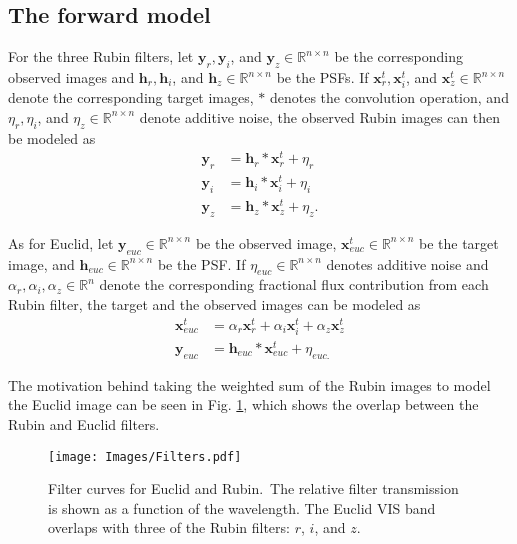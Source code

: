 \documentclass[traditabstract]{aa}
\begin{document}
\subsection{The forward model}
\label{forward_model1}

For the three Rubin filters, let $\mathbf{y}_r, \mathbf{y}_i$, and $\mathbf{y}_z \in\mathbb{R}^{n\times n}$ be the corresponding observed images and $\mathbf{h}_r, \mathbf{h}_i$, and $\mathbf{h}_z \in\mathbb{R}^{n\times n}$ be the PSFs. If $\mathbf{x}_r^t, \mathbf{x}_i^t$, and $\mathbf{x}_z^t \in \mathbb{R}^{n \times n}$ denote the corresponding target images, $\ast$ denotes the convolution operation, and $\eta_r, \eta_i$, and $ \eta_z \in\mathbb{R}^{n\times n}$ denote additive noise, the observed Rubin images can then be modeled as
\begin{align} 
    \mathbf{y}_r &= \mathbf{h}_r \ast \mathbf{x}_r^t + \eta_r \\[5pt]
    \mathbf{y}_i &= \mathbf{h}_i \ast \mathbf{x}_i^t + \eta_i \\[5pt]
    \mathbf{y}_z &= \mathbf{h}_z \ast \mathbf{x}_z^t + \eta_z. 
\end{align}

As for Euclid, let $\mathbf{y}_{euc} \in\mathbb{R}^{n\times n}$ be the observed image, $\mathbf{x}^t_{euc} \in\mathbb{R}^{n\times n}$ be the target image, and $\mathbf{h}_{euc} \in\mathbb{R}^{n\times n}$ be the PSF. If $\eta_{euc} \in\mathbb{R}^{n\times n}$ denotes additive noise and $\alpha_r, \alpha_i, \alpha_z \in \mathbb{R}^{n}$ denote the corresponding fractional flux contribution from each Rubin filter, the target and the observed images can be modeled as
\begin{align} 
    \mathbf{x}^t_{euc} &= \alpha_r \mathbf{x}^t_r + \alpha_i \mathbf{x}^t_i + \alpha_z \mathbf{x}^t_z \\[5pt]
    \mathbf{y}_{euc} &= \mathbf{h}_{euc} \ast \mathbf{x}_{euc}^t + \eta_{euc.}
\end{align}

\noindent The motivation behind taking the weighted sum of the Rubin images to model the Euclid image can be seen in Fig. \ref{fig:filters}, which shows the overlap between the Rubin and Euclid filters. 

\begin{figure}[h!]
    \centering\label{subfig:LSST_filters}\texttt{[image: Images/Filters.pdf]}
    \caption{Filter curves for Euclid and Rubin.\  The relative filter transmission is shown as a function of the wavelength. The Euclid VIS band overlaps with three of the Rubin filters: $r$, $i$, and $z$.}
    \label{fig:filters}
\end{figure}
\end{document}
